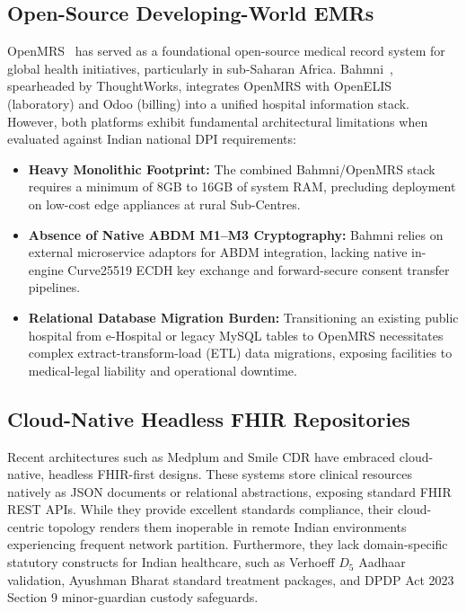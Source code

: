 \documentclass[journal,twocolumn]{IEEEtran}
\begin{document}
\subsection{Open-Source Developing-World EMRs}
OpenMRS~\cite{seebregts_openmrs} has served as a foundational open-source medical record system for global health initiatives, particularly in sub-Saharan Africa. Bahmni~\cite{bahmni_architecture}, spearheaded by ThoughtWorks, integrates OpenMRS with OpenELIS (laboratory) and Odoo (billing) into a unified hospital information stack. However, both platforms exhibit fundamental architectural limitations when evaluated against Indian national DPI requirements:
\begin{itemize}
    \item \textbf{Heavy Monolithic Footprint:} The combined Bahmni/OpenMRS stack requires a minimum of 8GB to 16GB of system RAM, precluding deployment on low-cost edge appliances at rural Sub-Centres.
    \item \textbf{Absence of Native ABDM M1--M3 Cryptography:} Bahmni relies on external microservice adaptors for ABDM integration, lacking native in-engine Curve25519 ECDH key exchange and forward-secure consent transfer pipelines.
    \item \textbf{Relational Database Migration Burden:} Transitioning an existing public hospital from e-Hospital or legacy MySQL tables to OpenMRS necessitates complex extract-transform-load (ETL) data migrations, exposing facilities to medical-legal liability and operational downtime.
\end{itemize}

\subsection{Cloud-Native Headless FHIR Repositories}
Recent architectures such as Medplum and Smile CDR have embraced cloud-native, headless FHIR-first designs. These systems store clinical resources natively as JSON documents or relational abstractions, exposing standard FHIR REST APIs. While they provide excellent standards compliance, their cloud-centric topology renders them inoperable in remote Indian environments experiencing frequent network partition. Furthermore, they lack domain-specific statutory constructs for Indian healthcare, such as Verhoeff $D_5$ Aadhaar validation, Ayushman Bharat standard treatment packages, and DPDP Act 2023 Section 9 minor-guardian custody safeguards.
\end{document}
